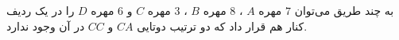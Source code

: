 \EXERCISE
به چند طریق می‌توان
$7$
مهره
$A$
،
$8$
مهره
$B$
،
$3$
مهره
$C$
و
$6$
مهره
$D$
را در یک ردیف کنار هم قرار داد که دو ترتیب دوتایی
$CA$
و
$CC$
در آن وجود ندارد.